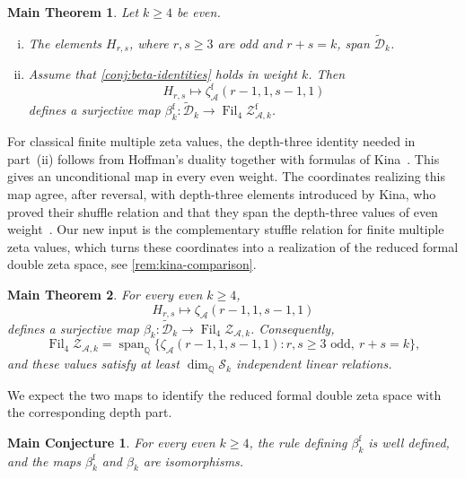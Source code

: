 \documentclass[12pt]{amsart}
\numberwithin{equation}{section}
\theoremstyle{plain}
\newtheorem{mainthm}{Main Theorem}
\newtheorem{mainconj}[mainconj]{Main Conjecture}
\newcommand{\QQ}{\mathbb{Q}}
\DeclareMathOperator{\Span}{span}
\DeclareMathOperator{\Fil}{Fil}
\newcommand{\ZAw}[1]{{\mathcal Z_{\mathcal A,#1}}}
\newcommand{\ZAfw}[1]{{\mathcal Z_{\mathcal A,#1}^{\mathrm f}}}
\newcommand{\za}[1]{\zeta_{\mathcal A}(#1)}
\newcommand{\zaf}[1]{\zeta_{\mathcal A}^{\mathrm f}(#1)}
\newcommand{\Dtk}{\widetilde{\mathcal D}_k}
\begin{document}
\begin{mainthm}\label{main:double-zeta-surjection}
Let $k\geq4$ be even.
\begin{enumerate}[(i)]
\item The elements $H_{r,s}$, where $r,s\geq3$ are odd and $r+s=k$, span
$\Dtk$.
\item Assume that \cref{conj:beta-identities} holds in weight $k$. Then 
\[
 H_{r,s}\longmapsto\zaf{r-1,1,s-1,1}
\]
defines a surjective map
$\beta_k^{\mathrm f}:\Dtk\to\Fil_4\ZAfw{k}$.
\end{enumerate}
\end{mainthm}

For classical finite multiple zeta values, the depth-three identity needed in
part~(ii) follows from Hoffman's duality together with formulas of
Kina~\cite{HoffmanFinite,Kina}. This gives an unconditional map in every even
weight. The coordinates realizing this map agree, after reversal, with
depth-three elements introduced by Kina, who proved their shuffle relation
and that they span the depth-three values of even weight~\cite{Kina}. Our new
input is the complementary stuffle relation for finite multiple zeta values,
which turns these coordinates into a realization of the reduced formal double
zeta space, see \cref{rem:kina-comparison}.

\begin{mainthm}\label{main:classical-beta}
For every even $k\geq4$, 
\[
 H_{r,s}\longmapsto\za{r-1,1,s-1,1}
\]
defines a surjective map
$\beta_k:\Dtk\to\Fil_4\ZAw{k}$. Consequently,
\[
 \Fil_4\ZAw{k}
 =\Span_{\QQ}\{\za{r-1,1,s-1,1}:r,s\geq3\text{ odd},\ r+s=k\},
\]
and these values satisfy at least $\dim_{\QQ}\mathcal S_k$ independent
linear relations.
\end{mainthm}

We expect the two maps to identify the reduced formal double zeta space with
the corresponding depth part.

\begin{mainconj}\label{main:double-zeta}
For every even $k\geq4$, the rule defining $\beta_k^{\mathrm f}$ is well
defined, and the maps $\beta_k^{\mathrm f}$ and $\beta_k$ are isomorphisms.
\end{mainconj}
\end{document}
